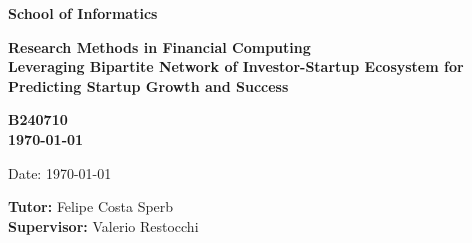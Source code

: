 \documentclass[a4paper,11pt]{article}
\newcommand{\examnumber}{B240710}
\newcommand{\field}{Leveraging Bipartite Network of Investor-Startup Ecosystem for Predicting Startup Growth and Success}
\newcommand{\tutor}{Felipe Costa Sperb}
\newcommand{\supervisor}{Valerio Restocchi}
\begin{document}
\begin{minipage}[b]{110mm}
        {\Huge\bf School of Informatics
        \vspace*{17mm}}
\end{minipage}
\hfill
\begin{minipage}[t]{40mm}               
\end{minipage}
\par\noindent
\vspace*{2cm}
\begin{center}
        \Large\bf Research Methods in Financial Computing \\
        \Large\bf \field
\end{center}
\vspace*{1.5cm}
\begin{center}
        \bf \examnumber\\
        \monthyeardate\today
\end{center}
\vspace*{5mm}

%
%                       
\begin{abstract}
This research proposes to utilize network science to analyze a bipartite network comprising investors and start-ups. By employing methodologies such as centrality analysis and community detection, we aim to map the intricate relationships between investors and start-ups and predict future growth trajectories and success rates. The nodes in this network will represent both investors and start-ups, while links will denote investment relationships. This will represent the investor-start-up dynamics that influence start-up outcomes. This will offer venture capital firms and entrepreneurs a strategic tool to make informed decisions and optimize their investment and growth strategies, fostering robust entrepreneurial ecosystems.
\end{abstract}

\vspace*{1cm}

\vspace*{3cm}
Date: \today

\vfill
{\bf Tutor:} \tutor\\
{\bf Supervisor:} \supervisor
\newpage

\setcounter{page}{1}                            %
\footruleheight{1pt}
\headruleheight{1pt}
\rhead{- \thepage}
\cfoot{}
%
\end{document}
